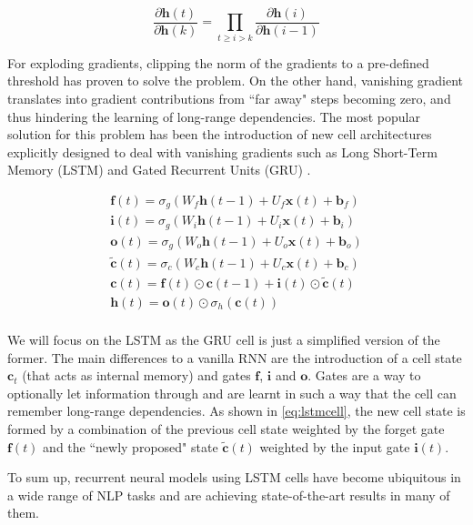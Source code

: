 \begin{equation} \label{eq:gradient}
	\frac{\partial \mathbf{h}(t)}{\partial \mathbf{h}(k)} = \prod_{t \geq i > k} \frac{\partial \mathbf{h}(i)}{\partial \mathbf{h}(i-1)}
\end{equation}

For exploding gradients, clipping the norm of the gradients to a pre-defined threshold has proven to solve the problem. On the other hand, vanishing gradient translates into gradient contributions from ``far away" steps becoming zero, and thus hindering the learning of long-range dependencies. The most popular solution for this problem has been the introduction of new cell architectures explicitly designed to deal with vanishing gradients such as Long Short-Term Memory (LSTM) \cite{hochreiter1997long} and Gated Recurrent Units (GRU) \cite{cho2014learning}.

\begin{equation} \label{eq:lstmcell}
	\begin{gathered}
		\mathbf{f}(t) = \sigma_g(W_f \mathbf{h}(t-1) + U_f\mathbf{x}(t) + \mathbf{b}_f) \\
		\mathbf{i}(t) = \sigma_g(W_i \mathbf{h}(t-1) + U_i \mathbf{x}(t) + \mathbf{b}_i) \\
		\mathbf{o}(t) = \sigma_g(W_o \mathbf{h}(t-1) + U_o \mathbf{x}(t) + \mathbf{b}_o) \\
		\mathbf{\tilde{c}}(t) = \sigma_c(W_c \mathbf{h}(t-1) + U_c \mathbf{x}(t) + \mathbf{b}_c) \\
		\mathbf{c}(t) = \mathbf{f}(t) \odot \mathbf{c}(t-1) + \mathbf{i}(t) \odot \mathbf{\tilde{c}}(t) \\
		\mathbf{h}(t) = \mathbf{o}(t) \odot \sigma_h(\mathbf{c}(t))\\
	\end{gathered}
\end{equation}


We will focus on the LSTM as the GRU cell is just a simplified version of the former. The main differences to a vanilla RNN are the introduction of a cell state $\mathbf{c}_t$ (that acts as internal memory) and gates $\mathbf{f}$, $\mathbf{i}$ and $\mathbf{o}$. Gates are a way to optionally let information through and are learnt in such a way that the cell can remember long-range dependencies. As shown in \autoref{eq:lstmcell}, the new cell state is formed by a combination of the previous cell state weighted by the forget gate $\mathbf{f}(t)$ and the ``newly proposed" state $\mathbf{\tilde{c}}(t)$ weighted by the input gate $\mathbf{i}(t)$.

To sum up, recurrent neural models using LSTM cells have become ubiquitous in a wide range of NLP tasks and are achieving state-of-the-art results in many of them.
